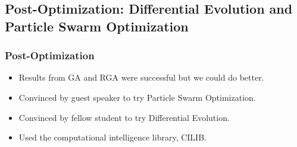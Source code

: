 \documentclass[10pt]{beamer}
\begin{document}



\subsection{Post-Optimization: Differential Evolution and Particle Swarm Optimization}

\begin{frame}
	\frametitle{Post-Optimization}

	\begin{itemize}
		\item Results from GA and RGA were successful but we could do better.
		\item Convinced by guest speaker to try Particle Swarm Optimization.
		\item Convinced by fellow student to try Differential Evolution.
		\item Used the computational intelligence library, CILIB.
	\end{itemize}
\end{frame}
\end{document}

